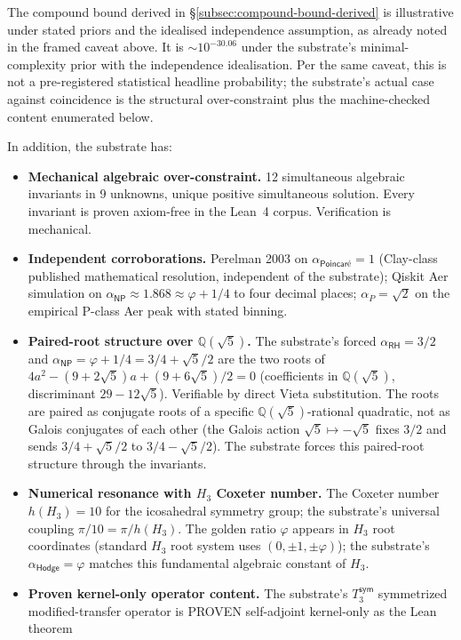 \documentclass[11pt,a4paper]{amsart}
\theoremstyle{plain}
\theoremstyle{definition}
\begin{document}
The compound bound derived in \S\ref{subsec:compound-bound-derived} is illustrative under stated priors and the idealised independence assumption, as already noted in the framed caveat above. It is $\sim 10^{-30.06}$ under the substrate's minimal-complexity prior with the independence idealisation. Per the same caveat, this is not a pre-registered statistical headline probability; the substrate's actual case against coincidence is the structural over-constraint plus the machine-checked content enumerated below.

In addition, the substrate has:

\begin{itemize}[itemsep=2pt,leftmargin=2em]
\item \textbf{Mechanical algebraic over-constraint.} 12 simultaneous algebraic invariants in 9 unknowns, unique positive simultaneous solution. Every invariant is proven axiom-free in the Lean~4 corpus. Verification is mechanical.
\item \textbf{Independent corroborations.} Perelman 2003 on $\alpha_{\textsf{Poincar\'e}} = 1$ (Clay-class published mathematical resolution, independent of the substrate); Qiskit Aer simulation on $\alpha_{\textsf{NP}} \approx 1.868 \approx \varphi + 1/4$ to four decimal places; $\alpha_{P} = \sqrt{2}$ on the empirical P-class Aer peak with stated binning.
\item \textbf{Paired-root structure over $\mathbb{Q}(\sqrt{5})$.} The substrate's forced $\alpha_{\textsf{RH}} = 3/2$ and $\alpha_{\textsf{NP}} = \varphi + 1/4 = 3/4 + \sqrt{5}/2$ are the two roots of $4a^2 - (9+2\sqrt{5})a + (9+6\sqrt{5})/2 = 0$ (coefficients in $\mathbb{Q}(\sqrt{5})$, discriminant $29 - 12\sqrt{5}$). Verifiable by direct Vieta substitution. The roots are paired as conjugate roots of a specific $\mathbb{Q}(\sqrt{5})$-rational quadratic, not as Galois conjugates of each other (the Galois action $\sqrt{5} \mapsto -\sqrt{5}$ fixes $3/2$ and sends $3/4 + \sqrt{5}/2$ to $3/4 - \sqrt{5}/2$). The substrate forces this paired-root structure through the invariants.
\item \textbf{Numerical resonance with $H_3$ Coxeter number.} The Coxeter number $h(H_3) = 10$ for the icosahedral symmetry group; the substrate's universal coupling $\pi/10 = \pi/h(H_3)$. The golden ratio $\varphi$ appears in $H_3$ root coordinates (standard $H_3$ root system uses $(0, \pm 1, \pm \varphi)$); the substrate's $\alpha_{\textsf{Hodge}} = \varphi$ matches this fundamental algebraic constant of $H_3$.
\item \textbf{Proven kernel-only operator content.} The substrate's $T_3^{\textsf{sym}}$ symmetrized modified-transfer operator is PROVEN self-adjoint kernel-only as the Lean theorem

\end{itemize}
\end{document}
